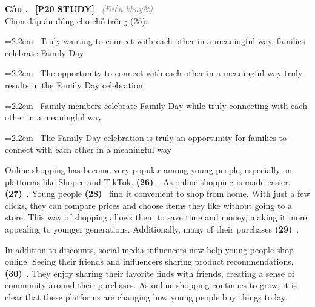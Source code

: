 \documentclass[12pt,a4paper,twoside]{article}
\newcounter{qcounter}
\newcommand{\question}[2][]{%
    \stepcounter{qcounter}%
    \par\vspace{6pt}%
    \noindent\textcolor{primaryBlue}{\textbf{Câu \theqcounter.}}~%
    \textcolor{secondaryBlue}{\small\textbf{[P20 STUDY]}}~%
    \if\relax\detokenize{#1}\relax\else\textcolor{gray}{\small\textit{(#1)}}~\fi\\[1pt]
    \noindent #2%
}
\newcommand{\choiceitem}[2]{%
    \tikz[baseline=-0.5ex]{%
        \node[draw=primaryBlue, circle, minimum size=1.5em, inner sep=0pt, thick] {\textbf{#1}};%
    }~#2%
}
\newenvironment{readingpassage}[1][]{%
    \begin{tcolorbox}[enhanced, colback=grayLight, colframe=secondaryBlue,
        coltitle=textDark, fonttitle=\bfseries, title={#1},
        rounded corners, arc=3mm, boxrule=1pt,
        left=15pt, right=15pt, top=10pt, bottom=10pt,
        breakable, before skip=10pt, after skip=10pt, drop fuzzy shadow]
    \setstretch{1.3}
}{\end{tcolorbox}}
\begin{document}
\question[Điền khuyết]{Chọn đáp án đúng cho chỗ trống (25):}

\par\vspace{4pt}
\noindent\hangindent=2.2em\choiceitem{A}{Truly wanting to connect with each other in a meaningful way, families celebrate Family Day}\par\vspace{4pt}
\noindent\hangindent=2.2em\choiceitem{B}{The opportunity to connect with each other in a meaningful way truly results in the Family Day celebration}\par\vspace{4pt}
\noindent\hangindent=2.2em\choiceitem{C}{Family members celebrate Family Day while truly connecting with each other in a meaningful way}\par\vspace{4pt}
\noindent\hangindent=2.2em\choiceitem{D}{The Family Day celebration is truly an opportunity for families to connect with each other in a meaningful way}\par\vspace{4pt}

\begin{readingpassage}[]
Online shopping has become very popular among young people, especially on platforms like Shopee and TikTok. \textbf{(26)}~\underline{\hspace{1.3cm}}. As online shopping is made easier, \textbf{(27)}~\underline{\hspace{1.3cm}}. Young people \textbf{(28)}~\underline{\hspace{1.3cm}} find it convenient to shop from home. With just a few clicks, they can compare prices and choose items they like without going to a store. This way of shopping allows them to save time and money, making it more appealing to younger generations. Additionally, many of their purchases \textbf{(29)}~\underline{\hspace{1.3cm}}.

In addition to discounts, social media influencers now help young people shop online. Seeing their friends and influencers sharing product recommendations, \textbf{(30)}~\underline{\hspace{1.3cm}}. They enjoy sharing their favorite finds with friends, creating a sense of community around their purchases. As online shopping continues to grow, it is clear that these platforms are changing how young people buy things today.
\end{readingpassage}
\end{document}
